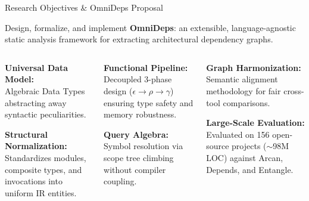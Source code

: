 \documentclass[aspectratio=169,10pt]{beamer}
\begin{document}
\begin{frame}{Research Objectives \& OmniDeps Proposal}
  \par\vspace{0.3em}
  
  {\small Design, formalize, and implement \textbf{OmniDeps}: an extensible, language-agnostic static analysis framework for extracting architectural dependency graphs.}\par\vspace{0.3em}

  \begin{columns}[T,onlytextwidth]
      \begin{cookiecard}[title={Formal IR},height=3.8cm]
        \fontsize{7.5}{9.5}\selectfont
        \textbf{Universal Data Model:}\\
        Algebraic Data Types abstracting away syntactic peculiarities.\par\vspace{0.35em}
        \textbf{Structural Normalization:}\\
        Standardizes modules, composite types, and invocations into uniform IR entities.
      \end{cookiecard}

      \begin{cookiecard}[title={Rust Engine},height=3.8cm]
        \fontsize{7.5}{9.5}\selectfont
        \textbf{Functional Pipeline:}\\
        Decoupled 3-phase design ($\epsilon \to \rho \to \gamma$) ensuring type safety and memory robustness.\par\vspace{0.35em}
        \textbf{Query Algebra:}\\
        Symbol resolution via scope tree climbing without compiler coupling.
      \end{cookiecard}

      \begin{cookiecard}[title={Empirical Benchmark},height=3.8cm]
        \fontsize{7.5}{9.5}\selectfont
        \textbf{Graph Harmonization:}\\
        Semantic alignment methodology for fair cross-tool comparisons.\par\vspace{0.35em}
        \textbf{Large-Scale Evaluation:}\\
        Evaluated on 156 open-source projects ($\sim$98M LOC) against Arcan, Depends, and Entangle.
      \end{cookiecard}
  \end{columns}


\end{frame}
\end{document}
